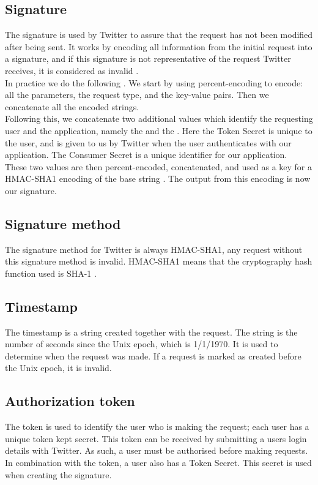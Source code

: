 \subsection*{Signature}
The signature is used by Twitter to assure that the request has not been
modified after being sent. It works by encoding all information from the initial
request into a signature, and if this signature is not representative of the
request Twitter receives, it is considered as invalid \citep[sec
3.4]{OAuth1}. \\
In practice we do the following \citep{TwitterAPISignature}. We start by using
percent-encoding to encode: all the parameters, the request type, and the
key-value pairs. Then we concatenate all the encoded strings. \\
Following this, we concatenate two additional values which identify the
requesting user and the application, namely the  and
the . Here the Token Secret is unique to the user, and is
given to us by Twitter when the user authenticates with our application. The
Consumer Secret is a unique identifier for our application.\\
These two values are then percent-encoded, concatenated, and used as a key for a
HMAC-SHA1 encoding of the base string \citep{TwitterHMACSHA}. The output from
this encoding is now our signature.
 
\subsection*{Signature method}
The signature method for Twitter is always HMAC-SHA1, any request without this
signature method is invalid. HMAC-SHA1 means that the cryptography hash function
used is \ac{SHA-1} \citep{TwitterHMACSHA}.

\subsection*{Timestamp}
The timestamp is a string created together with the request. The string is the
number of seconds since the Unix epoch, which is 1/1/1970. It is used to
determine when the request was made. If a request is marked as created before
the Unix epoch, it is invalid.

\subsection*{Authorization token}
The token is used to identify the user who is making the request; each user has
a unique token kept secret. This token can be received by submitting a users
login details with Twitter. As such, a user must be authorised before making
requests. In combination with the token, a user also has a Token Secret. This
secret is used when creating the signature.

